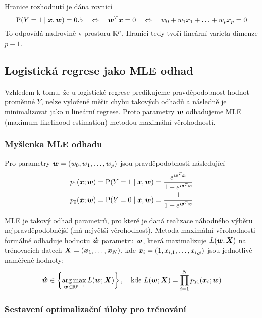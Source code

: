 \documentclass[../main.tex]{subfiles}
\begin{document}
Hranice rozhodnutí je dána rovnicí
\begin{equation*}
    \text{P} (Y=1 \mid \bm{x}, \bm{w} ) = 0.5
    \quad \Leftrightarrow \quad
    \bm{w}^T\bm{x} = 0
    \quad \Leftrightarrow \quad
    w_0 + w_1 x_1 + \ldots + w_p x_p = 0
\end{equation*}
To odpovídá nadrovině v prostoru $\mathbb{R}^p$. Hranici tedy tvoří lineární varieta dimenze $p-1$.

\subsection{Logistická regrese jako MLE odhad}

Vzhledem k tomu, že u logistické regrese predikujeme pravděpodobnost hodnot proměnné $Y$, nelze vyloženě měřit chybu takových odhadů a následně je minimalizovat jako u lineární regrese. Proto parametry $\bm{w}$ odhadujeme MLE (maximum likelihood estimation) metodou maximální věrohodností.

\subsubsection{Myšlenka MLE odhadu}

Pro parametry $\bm{w} = (w_0, w_1, \ldots, w_p)$ jsou pravděpodobnosti následující
\begin{align*}
    p_{1}(\bm{x}; \bm{w}) & = \text{P} (Y=1 \mid \bm{x}, \bm{w} ) = \frac{e^{\bm{w}^T\bm{x}}}{1 + e^{\bm{w}^T\bm{x}}} \\
    p_{0}(\bm{x}; \bm{w}) & = \text{P} (Y=0 \mid \bm{x}, \bm{w} ) = \frac{1}{1 + e^{\bm{w}^T\bm{x}}}
\end{align*}

MLE je takový odhad parametrů, pro které je daná realizace náhodného výběru nejpravděpodobnější (má největší věrohodnost). Metoda maximální věrohodnosti formálně odhaduje hodnotu $\bm{\hat{w}}$  parametru $\bm{w}$, která maximalizuje $L(\bm{w}; \bm{X})$ na trénovacích datech $\bm{X} = (\bm{x}_1, \ldots, \bm{x}_N)$, kde $\bm{x}_i = (1, x_{i, 1}, \ldots, x_{i, p})$ jsou jednotlivé naměřené hodnoty:
\begin{equation*}
    \bm{\hat{w}} \in \left\{\operatorname*{arg\,max}_{\bm{w} \in \mathbb{R}^{p+1}} L(\bm{w}; \bm{X})\right\},
    \quad \text{kde }
    L(\bm{w}; \bm{X}) = \prod_{i=1}^{N} p_{Y_i}(\bm{x}_i; \bm{w})
\end{equation*}

\subsubsection{Sestavení optimalizační úlohy pro trénování}
\end{document}
